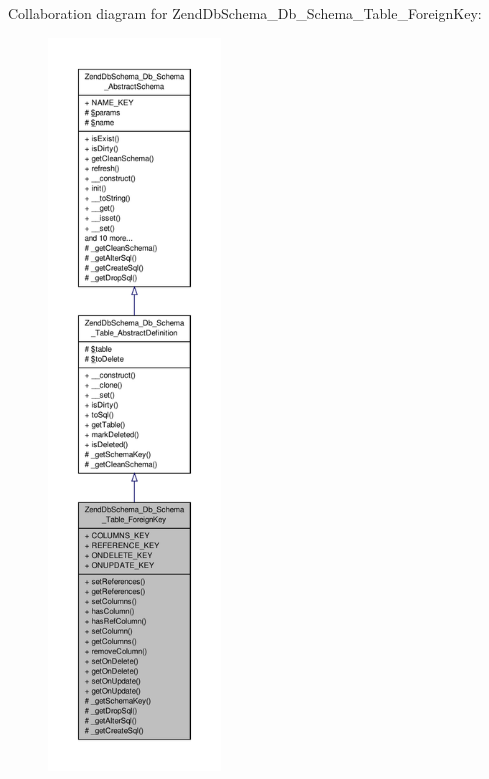 Collaboration diagram for Zend\-Db\-Schema\-\_\-\-Db\-\_\-\-Schema\-\_\-\-Table\-\_\-\-Foreign\-Key\-:\nopagebreak
\begin{figure}[H]
\begin{center}
\leavevmode
\includegraphics[height=550pt]{classZendDbSchema__Db__Schema__Table__ForeignKey__coll__graph}
\end{center}
\end{figure}
